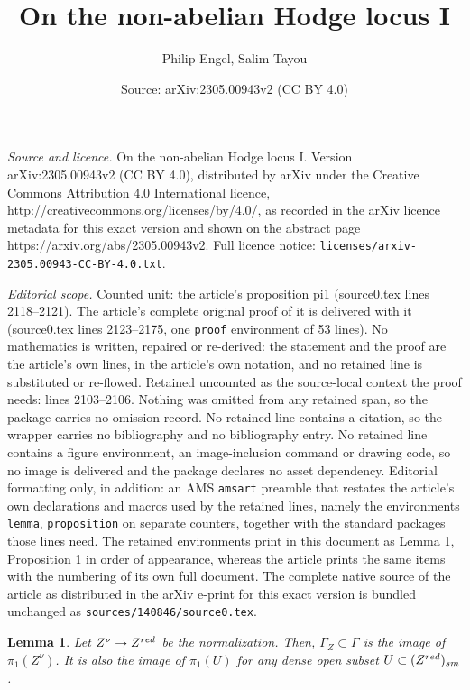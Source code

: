 \documentclass[10pt,a4paper]{amsart}
\title{On the non-abelian Hodge locus I}
\author{Philip Engel, Salim Tayou}
\date{Source: arXiv:2305.00943v2 (CC BY 4.0)}
\newtheorem{lemma}{Lemma}
\begin{document}
\maketitle

\noindent\emph{Source and licence.} On the non-abelian Hodge locus I. Version arXiv:2305.00943v2 (CC BY 4.0), distributed by arXiv under the Creative Commons Attribution 4.0 International licence, http://creativecommons.org/licenses/by/4.0/, as recorded in the arXiv licence metadata for this exact version and shown on the abstract page https://arxiv.org/abs/2305.00943v2. Full licence notice: \texttt{licenses/arxiv-2305.00943-CC-BY-4.0.txt}.\par\smallskip

\noindent\textit{Editorial scope.} Counted unit: the article's proposition pi1 (source0.tex lines 2118--2121). The article's complete original proof of it is delivered with it (source0.tex lines 2123--2175, one \texttt{proof} environment of 53 lines). No mathematics is written, repaired or re-derived: the statement and the proof are the article's own lines, in the article's own notation, and no retained line is substituted or re-flowed.  Retained uncounted as the source-local context the proof needs: lines 2103--2106.  Nothing was omitted from any retained span, so the package carries no omission record.  No retained line contains a citation, so the wrapper carries no bibliography and no bibliography entry.  No retained line contains a figure environment, an image-inclusion command or drawing code, so no image is delivered and the package declares no asset dependency.  Editorial formatting only, in addition: an AMS \texttt{amsart} preamble that restates the article's own declarations and macros used by the retained lines, namely the environments \texttt{lemma}, \texttt{proposition} on separate counters, together with the standard packages those lines need.  The retained environments print in this document as Lemma 1, Proposition 1 in order of appearance, whereas the article prints the same items with the numbering of its own full document.  The complete native source of the article as distributed in the arXiv e-print for this exact version is bundled unchanged as \texttt{sources/140846/source0.tex}.
\begin{lemma}\label{normal2} Let $Z^\nu\to Z^{\rm red}$ be the
normalization. Then, $\Gamma_Z\subset \Gamma$ is the image
of $\pi_1(Z^\nu)$. It is also the image of $\pi_1(U)$
for any dense open subset $U\subset (Z^{\rm red})_{\rm sm}$. \end{lemma}
\end{document}
